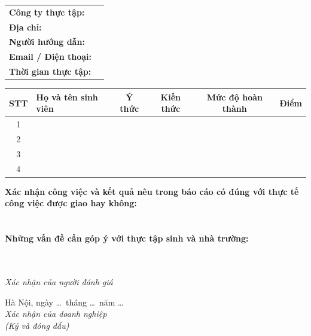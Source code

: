 \vspace{0.6cm}

\noindent
\begin{tabular}{@{}p{4.2cm}p{11cm}@{}}
\textbf{Công ty thực tập:} & \dotfill \\[0.45cm]
\textbf{Địa chỉ:}          & \dotfill \\[0.45cm]
\textbf{Người hướng dẫn:}  & \dotfill \\[0.45cm]
\textbf{Email / Điện thoại:} & \dotfill \\[0.45cm]
\textbf{Thời gian thực tập:} & \dotfill \\
\end{tabular}

\vspace{0.9cm}

\begin{table}[H]
\centering
\small
\begin{tabularx}{\textwidth}{@{}cXcccc@{}}
\toprule
\textbf{STT} & \textbf{Họ và tên sinh viên} & \textbf{Ý thức} &
\textbf{Kiến thức} & \textbf{Mức độ hoàn thành} & \textbf{Điểm} \\
\midrule
1 & & & & & \\[0.6cm]
2 & & & & & \\[0.6cm]
3 & & & & & \\[0.6cm]
4 & & & & & \\[0.6cm]
\bottomrule
\end{tabularx}
\end{table}

\vspace{0.5cm}

\noindent\textbf{Xác nhận công việc và kết quả nêu trong báo cáo có đúng với thực
tế công việc được giao hay không:}\\[0.15cm]
\noindent\dotfill\\[0.4cm]
\noindent\dotfill\\[0.4cm]

\noindent\textbf{Những vấn đề cần góp ý với thực tập sinh và nhà trường:}\\[0.15cm]
\noindent\dotfill\\[0.4cm]
\noindent\dotfill\\[0.4cm]

\vspace{1.2cm}

\noindent
\begin{minipage}[t]{0.48\textwidth}
\centering
\textit{Xác nhận của người đánh giá}\\[2.4cm]
\dotfill
\end{minipage}
\hfill
\begin{minipage}[t]{0.48\textwidth}
\centering
Hà Nội, ngày \dots\ tháng \dots\ năm \dots\\[0.15cm]
\textit{Xác nhận của doanh nghiệp}\\
\textit{(Ký và đóng dấu)}\\[2cm]
\dotfill
\end{minipage}

\fi

